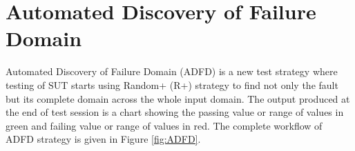 \documentclass{acm_proc_article-sp}
\begin{document}


\section{Automated Discovery of Failure Domain}\label{sec:adfd}

Automated Discovery of Failure Domain (ADFD) is a new test strategy where testing of SUT starts using Random+ (R+) strategy to find not only the fault but its complete domain across the whole input domain. The output produced at the end of test session is a chart showing the passing value or range of values in green and failing value or range of values in red. The complete workflow of ADFD strategy is given in Figure \ref{fig:ADFD}.
\end{document}
